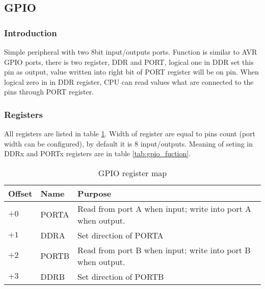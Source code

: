 \subsection{GPIO}

\subsubsection{Introduction}

Simple peripheral with two 8bit input/outputs ports. Function is similar to AVR
GPIO ports, there is two register, DDR and PORT, logical one in DDR set this
pin as output, value written into right bit of PORT register will be on pin.
When logical zero in in DDR register, CPU can read values what are connected to
the pins through PORT register.

\subsubsection{Registers}

All registers are listed in table \ref{tab:gpio_reg_map}. Width of register are
equal to pins count (port width can be configured), by default it is 8
input/outputs. Meaning of seting in DDRx and PORTx registers are in table
\ref{tab:gpio_fuction}.

\begin{table}[h]
    \centering
    \begin{tabular}{|l|l|l|}
        \hline
        \textbf{Offset} & \textbf{Name} & \textbf{Purpose}                                            \\ \hline
        $+0$            & PORTA         & Read from port A when input; write into port A when output. \\ \hline
        $+1$            & DDRA          & Set direction of PORTA                                      \\ \hline
        $+2$            & PORTB         & Read from port B when input; write into port B when output. \\ \hline
        $+3$            & DDRB          & Set direction of PORTB                                      \\ \hline
    \end{tabular}
    \caption{GPIO register map}
    \label{tab:gpio_reg_map}
\end{table}

